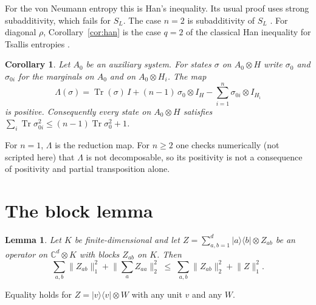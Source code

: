 \documentclass[11pt]{article}
\newtheorem{lemma}[theorem]{Lemma}
\newtheorem{corollary}[theorem]{Corollary}
\theoremstyle{remark}
\newcommand{\Tr}{\operatorname{Tr}}
\newcommand{\norm}[1]{\lVert #1\rVert}
\begin{document}
For the von Neumann entropy this is Han's inequality. Its usual proof uses strong subadditivity, which fails for $S_L$.
The case $n=2$ is subadditivity of $S_L$ \cite{Aud}. For diagonal $\rho$, Corollary~\ref{cor:han} is the case $q=2$ of
the classical Han inequality for Tsallis entropies \cite{FYK}.

\begin{corollary}\label{cor:map}
Let $A_0$ be an auxiliary system. For states $\sigma$ on $A_0\otimes H$ write $\sigma_0$ and $\sigma_{0i}$ for the
marginals on $A_0$ and on $A_0\otimes H_i$. The map
\[
\Lambda(\sigma)=\Tr(\sigma)\,I+(n-1)\,\sigma_0\otimes I_H-\sum_{i=1}^n\sigma_{0i}\otimes I_{H_{\hat\imath}}
\]
is positive. Consequently every state on $A_0\otimes H$ satisfies $\sum_i\Tr\sigma_{0i}^2\le(n-1)\Tr\sigma_0^2+1$.
\end{corollary}

For $n=1$, $\Lambda$ is the reduction map. For $n\ge2$ one checks numerically (not scripted here) that $\Lambda$ is not decomposable, so its
positivity is not a consequence of positivity and partial transposition alone.

\section{The block lemma}

\begin{lemma}\label{lem:R}
Let $K$ be finite-dimensional and let $Z=\sum_{a,b=1}^d|a\rangle\langle b|\otimes Z_{ab}$ be an operator on
$\mathbb C^d\otimes K$ with blocks $Z_{ab}$ on $K$. Then
\begin{equation}\label{eq:R}
\sum_{a,b}\norm{Z_{ab}}_1^2+\Big\|\sum_aZ_{aa}\Big\|_2^2\;\le\;\sum_{a,b}\norm{Z_{ab}}_2^2+\norm{Z}_1^2 .
\end{equation}
\end{lemma}

Equality holds for $Z=|v\rangle\langle v|\otimes W$ with any unit $v$ and any $W$.
\end{document}
